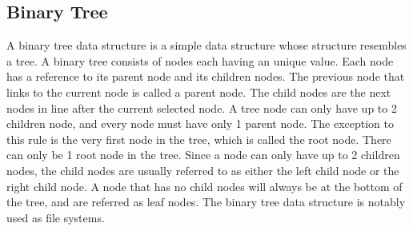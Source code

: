 \subsection{Binary Tree}
A binary tree data structure is a simple data structure whose structure resembles a tree. A binary tree consists of nodes each having an unique value. Each node has a reference to its parent node and its children nodes. The previous node that links to the current node is called a parent node. The child nodes are the next nodes in line after the current selected node. A tree node can only have up to 2 children node, and every node must have only 1 parent node. The exception to this rule is the very first node in the tree, which is called the root node. There can only be 1 root node in the tree. Since a node can only have up to 2 children nodes, the child nodes are usually referred to as either the left child node or the right child node. A node that has no child nodes will always be at the bottom of the tree, and are referred as leaf nodes. The binary tree data structure is notably used as file systems.\cite{BinaryTree} 